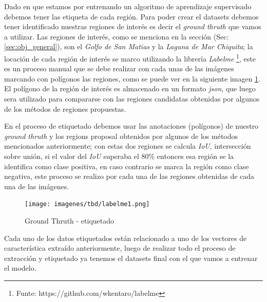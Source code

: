 


Dado en que estamos por entrenando un algoritmo de aprendizaje supervisado debemos tener las etiqueta de cada región. Para poder crear el datasets debemos tener identificado nuestras regiones de interés es decir el \textit{ground thruth} que vamos a utilizar. Las regiones de interés, como se menciona en la sección (Sec:\ref{sec:obj_general}), son el \textit{Golfo de San Matias} y la \textit{Laguna de Mar Chiquita}; la locación de cada región de interés se marco utilizando la librería \textit{Labelme} \footnote{Funte: https://github.com/wkentaro/labelme}, este es un proceso manual que se debe realizar con cada unas de las imágenes marcando con polígonos las regiones, como se puede ver en la siguiente imagen \ref{Fig:labelme-etiquetado}. El polígono de la región de interés es almacenado en un formato \textit{json}, que luego sera utilizado para compararse con las regiones candidatas obtenidas por algunos de los métodos de regiones propuestas. 


En el proceso de etiquetado debemos usar las anotaciones (polígonos) de nuestro \textit{ground thruth} y los regions proposal obtenidos por algunos de los métodos mencionados anteriormente; con estas dos regiones se calcula \textit{IoU}, intersección sobre unión, si el valor del \textit{IoU} superaba el 80\% entonces esa región se la identifica como clase positiva, en caso contrario se marca la región como clase negativa, este proceso se realizo por cada una de las regiones obtenidas de cada una de las imágenes.


\begin{figure}[H] \centering
  \texttt{[image: imagenes/tbd/labelme1.png]}
  \caption{Ground Thruth - etiquetado}\label{Fig:labelme-etiquetado}
\end{figure}

Cada uno de los datos etiquetados están relacionado a uno de los vectores de característica extraído anteriormente, luego de realizar todo el proceso de extracción y etiquetado ya tenemos el datasets final con el que vamos a entrenar el modelo.


